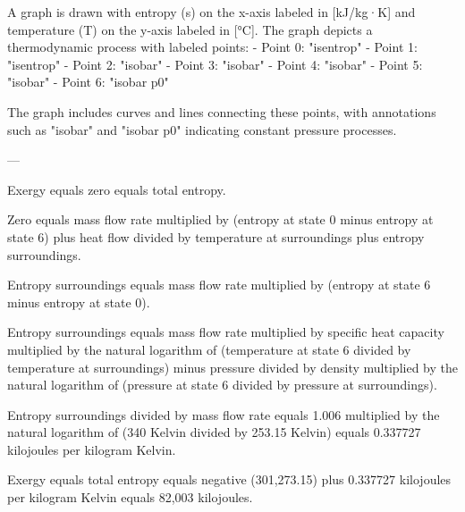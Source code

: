 A graph is drawn with entropy (s) on the x-axis labeled in [kJ/kg·K] and temperature (T) on the y-axis labeled in [°C]. The graph depicts a thermodynamic process with labeled points:  
- Point 0: "isentrop"  
- Point 1: "isentrop"  
- Point 2: "isobar"  
- Point 3: "isobar"  
- Point 4: "isobar"  
- Point 5: "isobar"  
- Point 6: "isobar p0"  

The graph includes curves and lines connecting these points, with annotations such as "isobar" and "isobar p0" indicating constant pressure processes.  

---

Exergy equals zero equals total entropy.  

Zero equals mass flow rate multiplied by (entropy at state 0 minus entropy at state 6) plus heat flow divided by temperature at surroundings plus entropy surroundings.  

Entropy surroundings equals mass flow rate multiplied by (entropy at state 6 minus entropy at state 0).  

Entropy surroundings equals mass flow rate multiplied by specific heat capacity multiplied by the natural logarithm of (temperature at state 6 divided by temperature at surroundings) minus pressure divided by density multiplied by the natural logarithm of (pressure at state 6 divided by pressure at surroundings).  

Entropy surroundings divided by mass flow rate equals 1.006 multiplied by the natural logarithm of (340 Kelvin divided by 253.15 Kelvin) equals 0.337727 kilojoules per kilogram Kelvin.  

Exergy equals total entropy equals negative (301,273.15) plus 0.337727 kilojoules per kilogram Kelvin equals 82,003 kilojoules.